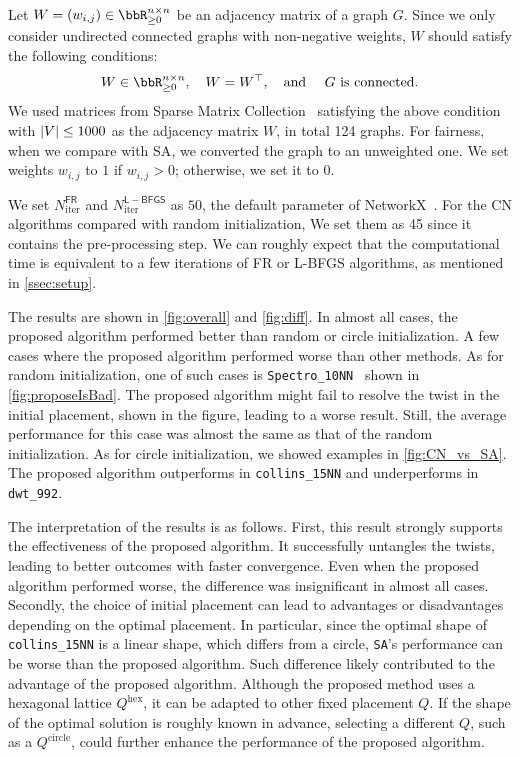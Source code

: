 \documentclass[dvipdfmx,10pt,journal,compsoc]{IEEEtran}
\begin{document}
Let $W = (w_{i,j}) \in \bbR_{\geq 0}^{n \times n}$ be an adjacency matrix of a graph $G$.
Since we only consider undirected connected graphs with non-negative weights, $W$ should satisfy the following conditions:
\begin{equation*}
  W \in \bbR_{\geq 0}^{n \times n}, \quad W = W^\top, \quad \text{and \quad $G$ is connected}.
\end{equation*}
We used matrices from Sparse Matrix Collection~\cite{davis2011university} satisfying the above condition with $\abs{V} \leq 1000$ as the adjacency matrix $W$, in total 124 graphs.
For fairness, when we compare with \textsf{SA}, we converted the graph to an unweighted one. We set weights $w_{i,j}$ to $1$ if $w_{i,j} > 0$; otherwise, we set it to $0$.

We set $N_\mathrm{iter}^\mathsf{FR}$ and $N_\mathrm{iter}^{\mathsf{L-BFGS}}$ as $50$, the default parameter of NetworkX~\cite{hagberg2008exploring}.
For the \textsf{CN} algorithms compared with random initialization,
We set them as 45 since it contains the pre-processing step. We can roughly expect that the computational time is equivalent to a few iterations of FR or L-BFGS algorithms, as mentioned in \cref{ssec:setup}.

The results are shown in \cref{fig:overall} and \cref{fig:diff}.
In almost all cases, the proposed algorithm performed better than random or circle initialization.
A few cases where the proposed algorithm performed worse than other methods.
As for random initialization, one of such cases is \texttt{Spectro\_10NN
} shown in \cref{fig:proposeIsBad}. The proposed algorithm might fail to resolve the twist in the initial placement, shown in the figure, leading to a worse result. Still, the average performance for this case was almost the same as that of the random initialization.
As for circle initialization, we showed examples in \cref{fig:CN_vs_SA}.
The proposed algorithm outperforms in \texttt{collins\_15NN} and underperforms in \texttt{dwt\_992}.

The interpretation of the results is as follows.
First, this result strongly supports the effectiveness of the proposed algorithm. It successfully untangles the twists, leading to better outcomes with faster convergence. Even when the proposed algorithm performed worse, the difference was insignificant in almost all cases.
Secondly, the choice of initial placement can lead to advantages or disadvantages depending on the optimal placement.
In particular, since the optimal shape of \texttt{collins\_15NN} is a linear shape, which differs from a circle, \texttt{SA}'s performance can be worse than the proposed algorithm.
Such difference likely contributed to the advantage of the proposed algorithm.
Although the proposed method uses a hexagonal lattice $Q^\mathrm{hex}$, it can be adapted to other fixed placement $Q$.
If the shape of the optimal solution is roughly known in advance, selecting a different $Q$, such as a $Q^\mathrm{circle}$, could further enhance the performance of the proposed algorithm.
\end{document}
